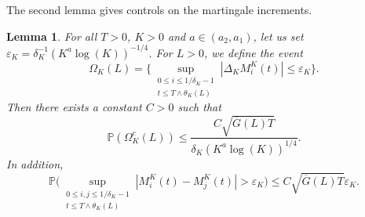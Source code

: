 \documentclass[10pt]{amsart}
\theoremstyle{plain}
\newtheorem{lemma}[theorem]{Lemma}
\theoremstyle{remark}
\begin{document}
The second lemma gives controls on the martingale increments.

\begin{lemma}
\label{corol:accrM}
For all $T>0$, $K>0$ and $a\in (a_2,a_1)$, let us set $\varepsilon_{K}= \delta_K^{-1}(K^{a}\log(K))^{-1/4}$. For $L>0$, we define the event
\begin{equation}
\Omega_{K}(L)=\biggl\{\sup_{\substack{0\leq i\leq 1/\delta_K-1\\ t\le T\wedge \theta_K(L)}} |\Delta_KM^K_{i}(t)| \le \varepsilon_{K}\biggr\}.\label{event:OmegaK}
\end{equation}
Then there exists a constant $C>0$ such that
\begin{equation}
\label{eq:estim-Omega}
\mathbb{P}(\Omega_K^c(L))
\leq \frac{C\sqrt{\overline{G}(L)T}}{\delta_K (K^a
\log(K))^{1/4}} .
\end{equation}
In addition,
\begin{equation}
\label{eq:borne-martingale-simple}
\mathbb{P} \biggl(\sup_{\substack{0\leq i,j\leq 1/\delta_K-1\\ t\le T\wedge \theta_K(L)}}\left|M^K_i(t)-M^K_j(t)\right|>\varepsilon_K \biggr)\leq C\sqrt{\overline{G}(L)T}
\varepsilon_K.
\end{equation}
\end{lemma}
\end{document}
